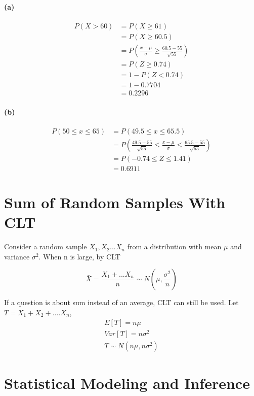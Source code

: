 \documentclass{article}
\begin{document}
    \paragraph{(a)}
    \begin{align*}
    P(X > 60) &= P(X \geq 61)\\
    &=P(X \geq 60.5)\\
    & = P(\frac{x-\mu}{\sigma} \geq \frac{60.5 - 55}{\sqrt{55}})\\
    & = P(Z \geq 0.74)\\
    & = 1 - P(Z < 0.74)\\
    & =1-0.7704\\
    & = 0.2296
    \end{align*}

    \paragraph*{(b)}
    \begin{align*}
        P(50 \leq x \leq 65) &= P(49.5 \leq x \leq 65.5)\\
        & = P(\frac{49.5-55}{\sqrt{55}} \leq \frac{x-\mu}{\sigma} \leq \frac{65.5-55}{\sqrt{55}})\\
        & = P(-0.74 \leq Z \leq 1.41)\\
        & = 0.6911
    \end{align*}

    \section*{Sum of Random Samples With CLT}
    Consider a random sample $X_{1}, X_{2}... X_{n}$ from a distribution with mean $\mu$ and variance
    $\sigma^{2}$. When n is large, by CLT

    \begin{equation*}    
          \bar{X} = \frac{X_{1}+...X_{n}}{n} \sim N(\mu, \frac{\sigma^{2}}{n})
    \end{equation*}

    If a question is about sum instead of an average, CLT can still be used.
    Let $T = X_{1} + X_{2} + .... X_{n}$,
    \begin{align*}
        E[T] = n\mu\\
        Var[T] = n\sigma^{2}\\
        T \sim N(n\mu, n\sigma^{2})
    \end{align*}

    \section*{Statistical Modeling and Inference}
\end{document}
